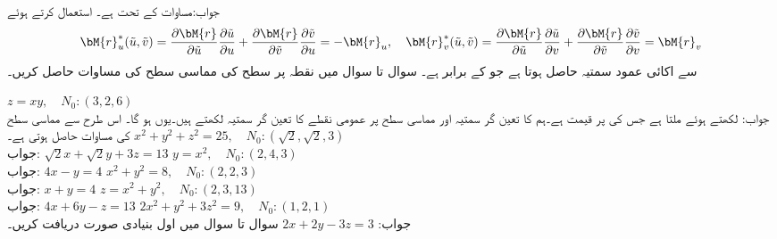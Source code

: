 جواب:\quad مساوات  کے تحت  ہے۔   استعمال کرتے ہوئے 
\begin{align*}
\bM{r}_u^*(\tilde{u},\tilde{v})=\frac{\partial \bM{r}}{\partial \tilde{u}}\frac{\partial \tilde{u}}{\partial u}+\frac{\partial \bM{r}}{\partial \tilde{v}}\frac{\partial \tilde{v}}{\partial u}=-\bM{r}_u,\quad
\bM{r}_v^*(\tilde{u},\tilde{v})=\frac{\partial \bM{r}}{\partial \tilde{u}}\frac{\partial \tilde{u}}{\partial v}+\frac{\partial \bM{r}}{\partial \tilde{v}}\frac{\partial \tilde{v}}{\partial v}=\bM{r}_v
\end{align*}
سے اکائی عمود سمتیہ  حاصل ہوتا ہے جو   کے برابر ہے۔
سوال  تا سوال  میں نقطہ  پر سطح  کی مماسی سطح کی مساوات حاصل کریں۔

\quad
$z=xy,\quad N_0:(3,2,6)$\\
جواب:\quad {} لکھتے ہوئے  ملتا ہے جس کی  پر قیمت 
 ہے۔ہم  کا تعین گر سمتیہ  اور مماسی سطح پر عمومی نقطے کا تعین گر سمتیہ   لکھتے ہیں۔یوں  ہو گا۔ اس طرح  سے  مماسی سطح کی مساوات   حاصل ہوتی ہے۔
\quad
$x^2+y^2+z^2=25,\quad N_0:(\sqrt{2},\sqrt{2},3)$\\
جواب:\quad 
$\sqrt{2}x+\sqrt{2}y+3z=13$
\quad
$y=x^2,\quad N_0:(2,4,3)$\\
جواب:\quad 
$4x-y=4$
\quad
$x^2+y^2=8,\quad N_0:(2,2,3)$\\
جواب:\quad 
$x+y=4$
\quad
$z=x^2+y^2,\quad N_0:(2,3,13)$\\
جواب:\quad 
$4x+6y-z=13$
\quad
$2x^2+y^2+3z^2=9,\quad N_0:(1,2,1)$\\
جواب:\quad 
$2x+2y-3z=3$
سوال  تا سوال  میں اول بنیادی صورت دریافت کریں۔

